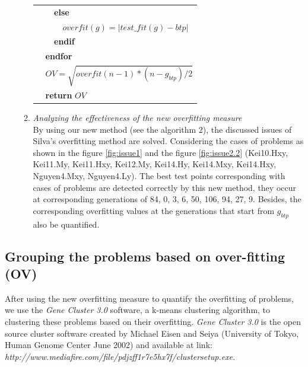 \begin{enumerate}
\begin{enumerate}
\begin{table}
\begin{tabular}{lllllllllll}
\multicolumn{1}{l|}{} & \multicolumn{1}{l|}{} & \multicolumn{9}{l}{\textbf{else}} \\
\multicolumn{1}{l|}{} & \multicolumn{1}{l|}{} & \multicolumn{1}{l|}{} & \multicolumn{8}{l}{ $overfit(g) = |test\_fit(g) - btp| $} \\
\multicolumn{1}{l|}{} & \multicolumn{1}{l|}{} & \multicolumn{9}{l}{\textbf{endif}} \\
\multicolumn{1}{l|}{} & \multicolumn{10}{l}{\textbf{endfor}} \\
\multicolumn{1}{l|}{} & \multicolumn{10}{l}{$OV=\sqrt{overfit(n-1)*(n-{g}_{btp})/2}$ } \\
\multicolumn{1}{l|}{} & \multicolumn{10}{l}{\textbf{return} $OV$ } \\
\end{tabular}
\end{table}

\item \textit{Analyzing the effectiveness of the new overfitting measure}\\
By using our new method (see the algorithm 2), the discussed issues of Silva's overfitting method are solved. Considering the cases of problems as shown in the figure \ref{fig:issue1} and the figure \ref{fig:issue2.2} (Kei10.Hxy, Kei11.My, Kei11.Hxy, Kei12.My, Kei14.Hy, Kei14.Mxy, Kei14.Hxy, Nguyen4.Mxy, Nguyen4.Ly). The best test points corresponding with cases of problems are detected correctly by this new method, they occur at corresponding generations of 84, 0, 3, 6, 50, 106, 94, 27, 9. Besides, the corresponding overfitting values at the generations that start from ${g}_{btp}$ also be quantified.
\end{enumerate}
\end{enumerate}

\subsection {Grouping the problems based on over-fitting (OV)}
\label{clus}
After using the new overfitting measure to quantify the overfitting of problems, we use the \textit{Gene Cluster 3.0} software, a k-means clustering algorithm, to clustering these problems based on their overfitting. \textit{Gene Cluster 3.0} is the open source cluster software created by Michael Eisen and Seiya (University of Tokyo, Human Genome Center June 2002) and available at link:\\
\textit{http://www.mediafire.com/file/pdjzff1r7e5hx7f/clustersetup.exe}.

